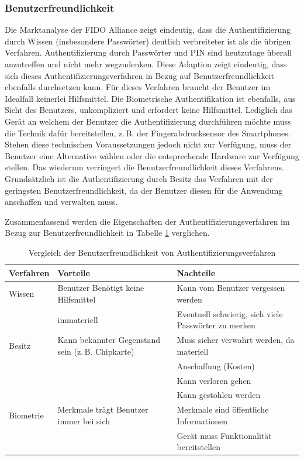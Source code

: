 \documentclass[11pt,a4paper,ngerman]{scrreprt}
\begin{document}
\subsubsection{Benutzerfreundlichkeit}
Die Marktanalyse der FIDO Alliance \cite{fido17} zeigt eindeutig, dass die Authentifizierung durch Wissen (insbesondere Passwörter) deutlich verbreiteter ist als die übrigen Verfahren. Authentifizierung durch Passwörter und PIN sind heutzutage überall anzutreffen und nicht mehr wegzudenken. Diese Adaption zeigt eindeutig, dass sich dieses Authentifizierungsverfahren in Bezug auf Benutzerfreundlichkeit ebenfalls durchsetzen kann. Für dieses Verfahren braucht der Benutzer im Idealfall keinerlei Hilfsmittel. Die Biometrische Authentifikation ist ebenfalls, aus Sicht des Benutzers, unkompliziert und erfordert keine Hilfsmittel. Lediglich das Gerät an welchem der Benutzer die Authentifizierung durchführen möchte muss die Technik dafür bereitstellen, z.\,B. der Fingerabdrucksensor des Smartphones. Stehen diese technischen Voraussetzungen jedoch nicht zur Verfügung, muss der Benutzer eine Alternative wählen oder die entsprechende Hardware zur Verfügung stellen. Das wiederum verringert die Benutzerfreundlichkeit dieses Verfahrens. Grundsätzlich ist die Authentifizierung durch Besitz das Verfahren mit der geringsten Benutzerfreundlichkeit, da der Benutzer diesen für die Anwendung anschaffen und verwalten muss. 

Zusammenfassend werden die Eigenschaften der Authentifizierungsverfahren im Bezug zur Benutzerfreundlichkeit in Tabelle \ref{table:Benutzerfreundlichkeit} verglichen.
\begin{table}[htbp]
    \begin{tabularx}{\textwidth}{ lXX }
        \toprule
        Verfahren & Vorteile & Nachteile \\ 
        \midrule
        Wissen & Benutzer Benötigt keine Hilfsmittel & Kann vom Benutzer vergessen werden \\
         & immateriell & Eventuell schwierig, sich viele Passwörter zu merken \\
        \midrule
        Besitz & Kann bekannter Gegenstand sein (z.\,B. Chipkarte) & Muss sicher verwahrt werden, da materiell \\
         & & Anschaffung (Kosten) \\
         & & Kann verloren gehen \\
         & & Kann gestohlen werden \\
        \midrule
        Biometrie & Merkmale trägt Benutzer immer bei sich & Merkmale sind öffentliche Informationen \\
         & & Gerät muss Funktionalität bereitstellen \\
        \bottomrule
    \end{tabularx}
    \caption{Vergleich der Benutzerfreundlichkeit von Authentifizierungsverfahren}
    \label{table:Benutzerfreundlichkeit}
\end{table}
\end{document}
